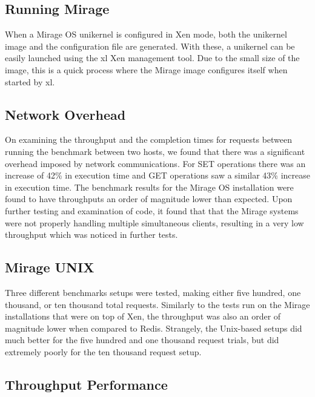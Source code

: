 \documentclass[english,10pt,twocolumn]{article}
\begin{document}
\subsection{Running Mirage}

When a Mirage OS unikernel is configured in Xen mode, both the unikernel image and the configuration file are generated.
With these, a unikernel can be easily launched using the xl Xen management tool.
Due to the small size of the image, this is a quick process where the Mirage image configures itself when started by xl.

\subsection{Network Overhead}

On examining the throughput and the completion times for requests between running the benchmark between two hosts, we found that there was a significant overhead imposed by network communications. For SET operations there was an increase of 42\% in execution time and GET operations saw a similar 43\% increase in execution time.
The benchmark results for the Mirage OS installation were found to have throughputs an order of magnitude lower than expected. 
Upon further testing and examination of code, it found that that the Mirage systems were not properly handling multiple simultaneous clients, resulting in a very low throughput which was noticed in further tests.


\subsection{Mirage \- UNIX}

Three different benchmarks setups were tested, making either five hundred, one thousand, or ten thousand total requests. 
Similarly to the tests run on the Mirage installations that were on top of Xen, the throughput was also an order of magnitude lower when compared to Redis. 
Strangely, the Unix-based setups did much better for the five hundred and one thousand request trials, but did extremely poorly for the ten thousand request setup.

\subsection{Throughput Performance}
\end{document}
